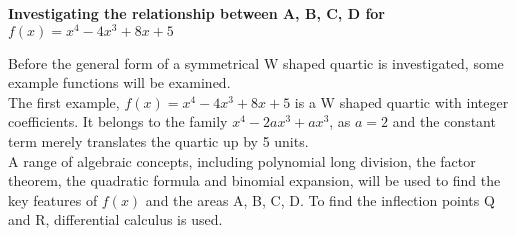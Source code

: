 \documentclass{homework}
\begin{document}
\vspace{1.6em}
\begin{center}
\textbf{\large{Investigating the relationship between A, B, C, D for $f(x)= x^4-4x^3+8x+5$}}
\end{center} 
\vspace{1.3em}
Before the general form of a symmetrical W shaped quartic is investigated, 
some example functions will be examined. \vspace{0.8em} \\
The first example, $ f(x)= x^4-4x^3+8x+5 $ is a W shaped quartic with integer coefficients. It belongs to the family $x^4-2ax^3+ax^3$, as $a=2$ and the constant term merely translates the quartic up by 5 units. \vspace{0.8em} \\
A range of algebraic concepts, including polynomial long division, the factor theorem, the quadratic formula and binomial expansion, will be used to find the key features of $f(x)$ and the areas A, B, C, D. To find the inflection points Q and R, differential calculus is used. 
\newpage
\end{document}

